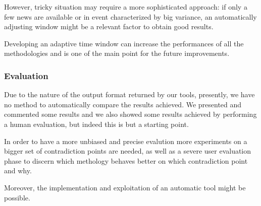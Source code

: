However, tricky situation may require a more sophisticated approach: if only a
few news are available or in event characterized by big variance, an
automatically adjusting window might be a relevant factor to obtain good
results.

Developing an adaptive time window can increase the performances of all the methodologies and is one of the main point for the future improvements.

\subsubsection*{Evaluation}
Due to the nature of the output format returned by our tools, presently, we have
no method to automatically compare the results achieved. We presented and
commented some results and we also showed some results achieved by performing a
human evaluation, but indeed this is but a starting point.

In order to have a more unbiased and precise evalution more experiments on a
bigger set of contradiction points are needed, as well as a severe user
evaluation phase to discern which methology behaves better on which
contradiction point and why.

Moreover, the implementation and exploitation of an automatic tool might be
possible.

